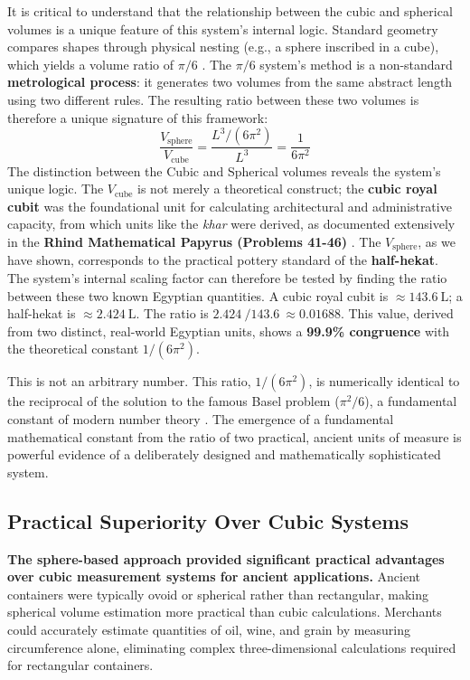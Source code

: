 \documentclass[11pt]{article}
\begin{document}
It is critical to understand that the relationship between the cubic and spherical volumes is a unique feature of this system's internal logic. Standard geometry compares shapes through physical nesting (e.g., a sphere inscribed in a cube), which yields a volume ratio of $\pi/6$ \cite{coxeter1973introduction}. The $\pi/6$ system's method is a non-standard \textbf{metrological process}: it generates two volumes from the same abstract length using two different rules. The resulting ratio between these two volumes is therefore a unique signature of this framework:
\[
\frac{V_{\text{sphere}}}{V_{\text{cube}}} = \frac{L^3 / (6\pi^2)}{L^3} = \frac{1}{6\pi^2}
\]
The distinction between the Cubic and Spherical volumes reveals the system's unique logic. The $V_{\text{cube}}$ is not merely a theoretical construct; the \textbf{cubic royal cubit} was the foundational unit for calculating architectural and administrative capacity, from which units like the \textit{khar} were derived, as documented extensively in the \textbf{Rhind Mathematical Papyrus (Problems 41-46)} \cite{clagett1999ancient}. The $V_{\text{sphere}}$, as we have shown, corresponds to the practical pottery standard of the \textbf{half-hekat}. The system's internal scaling factor can therefore be tested by finding the ratio between these two known Egyptian quantities. A cubic royal cubit is $\approx\SI{143.6}{\liter}$; a half-hekat is $\approx\SI{2.424}{\liter}$. The ratio is $\SI{2.424}{} / \SI{143.6}{} \approx 0.01688$. This value, derived from two distinct, real-world Egyptian units, shows a \textbf{99.9\% congruence} with the theoretical constant $1/(6\pi^2)$.

This is not an arbitrary number. This ratio, $1/(6\pi^2)$, is numerically identical to the reciprocal of the solution to the famous Basel problem ($\pi^2/6$), a fundamental constant of modern number theory \cite{dunham1999euler}. The emergence of a fundamental mathematical constant from the ratio of two practical, ancient units of measure is powerful evidence of a deliberately designed and mathematically sophisticated system.

\subsection{Practical Superiority Over Cubic Systems}

\textbf{The sphere-based approach provided significant practical advantages over cubic measurement systems for ancient applications.} Ancient containers were typically ovoid or spherical rather than rectangular, making spherical volume estimation more practical than cubic calculations. Merchants could accurately estimate quantities of oil, wine, and grain by measuring circumference alone, eliminating complex three-dimensional calculations required for rectangular containers.
\end{document}

